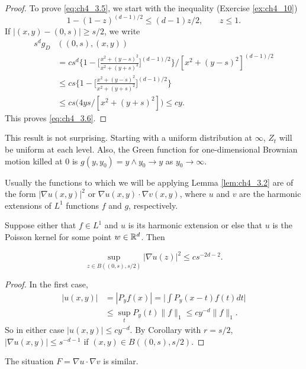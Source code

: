 \begin{proof}
To prove \eqref{eq:ch4_3.5}, we start with the inequality (Exercise \ref{ex:ch4_10})
\begin{equation}\label{eq:ch4_3.10}
    1-(1-z)^{(d-1)/2} \leq (d-1)z/2, \qquad z \leq 1.
\end{equation}
If $|(x,y)-(0,s)| \geq s/2$, we write
\begin{align*}
    s^d g_D&((0,s),(x,y)) \\
    &= cs^d\Big\{1-\Big[\frac{x^2+(y-s)^2}{x^2+(y+s)^2}\Big]^{(d-1)/2}\Big\} \Big/[x^2+(y-s)^2]^{(d-1)/2} \\
    &\leq cs\Big\{1-\Big[\frac{x^2+(y-s)^2}{x^2+(y+s)^2}\Big]^{(d-1)/2}\Big\} \\
    &\leq cs\big(4ys/[x^2+(y+s)^2]\big) \leq cy.
\end{align*}
This proves \eqref{eq:ch4_3.6}.
\end{proof}

This result is not surprising. Starting with a uniform distribution at $\infty$, $Z_t$ will be uniform at each level. Also, the Green function for one-dimensional Brownian motion killed at $0$ is $g(y,y_0) = y\wedge y_0 \to y$ as $y_0 \to \infty$.

Usually the functions to which we will be applying Lemma \ref{lem:ch4_3.2} are of the form $|\nabla u(x,y)|^2$ or $\nabla u(x,y)\cdot\nabla v(x,y)$, where $u$ and $v$ are the harmonic extensions of $L^1$ functions $f$ and $g$, respectively.

\begin{lemma}\label{lem:ch4_3.3}
Suppose either that $f \in L^1$ and $u$ is its harmonic extension or else that $u$ is the Poisson kernel for some point $w \in \mathbb{R}^d$. Then

\[\sup_{z\in B((0,s),s/2)} |\nabla u(z)|^2 \leq cs^{-2d-2}.\]
\end{lemma}

\begin{proof}
In the first case,
\mpagebreak
\begin{align*}
    |u(x,y)| &= |P_y f(x)| = \Big|\int P_y(x-t)f(t)dt\Big| \\
    &\leq \sup_t P_y(t)\|f\|_1 \leq cy^{-d}\|f\|_1.
\end{align*}
So in either case $|u(x,y)| \leq cy^{-d}$. By Corollary  with $r = s/2$, $|\nabla u(x,y)| \leq s^{-d-1}$ if $(x,y) \in B((0,s),s/2)$.
\end{proof}

The situation $F = \nabla u\cdot\nabla v$ is similar.

